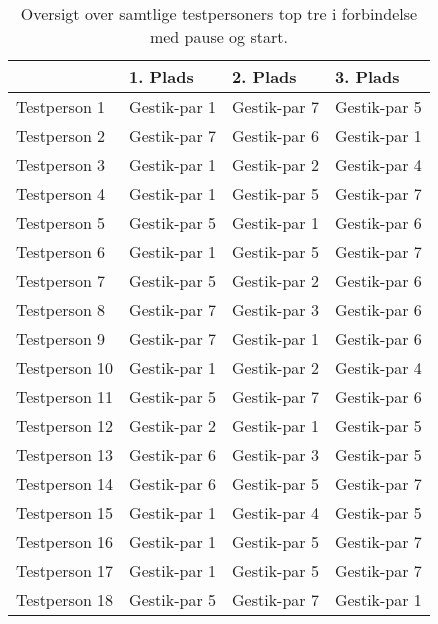 %
\begin{table}[H]
	\centering
	\begin{tabular}{ | p{3cm} | p{3cm} | p{3cm} | p{3cm} |}
	\hline
		 & 1. Plads & 2. Plads & 3. Plads \\ \hline
		Testperson 1 & Gestik-par 1 & Gestik-par 7 & Gestik-par 5 \\ \hline
		Testperson 2 & Gestik-par 7 & Gestik-par 6 & Gestik-par 1 \\ \hline
		Testperson 3 & Gestik-par 1 & Gestik-par 2 & Gestik-par 4 \\ \hline
		Testperson 4 & Gestik-par 1 & Gestik-par 5 & Gestik-par 7 \\ \hline
		Testperson 5 & Gestik-par 5 & Gestik-par 1 & Gestik-par 6 \\ \hline
		Testperson 6 & Gestik-par 1 & Gestik-par 5 & Gestik-par 7 \\ \hline 
		Testperson 7 & Gestik-par 5 & Gestik-par 2 & Gestik-par 6 \\ \hline
		Testperson 8 & Gestik-par 7 & Gestik-par 3 & Gestik-par 6 \\ \hline
		Testperson 9 & Gestik-par 7 & Gestik-par 1 & Gestik-par 6 \\ \hline
		Testperson 10 & Gestik-par 1 & Gestik-par 2 & Gestik-par 4 \\ \hline
		Testperson 11 & Gestik-par 5 & Gestik-par 7 & Gestik-par 6 \\ \hline
		Testperson 12 & Gestik-par 2 & Gestik-par 1 & Gestik-par 5 \\ \hline
		Testperson 13 & Gestik-par 6 & Gestik-par 3 & Gestik-par 5 \\ \hline
		Testperson 14 & Gestik-par 6 & Gestik-par 5 & Gestik-par 7 \\ \hline
		Testperson 15 & Gestik-par 1 & Gestik-par 4 & Gestik-par 5 \\ \hline
		Testperson 16 & Gestik-par 1 & Gestik-par 5 & Gestik-par 7 \\ \hline
		Testperson 17 & Gestik-par 1 & Gestik-par 5 & Gestik-par 7 \\ \hline
		Testperson 18 & Gestik-par 5 & Gestik-par 7 & Gestik-par 1 \\ \hline
	\end{tabular}
	\caption{Oversigt over samtlige testpersoners top tre i forbindelse med pause og start.}
	\label{tab:GestikParITopTrePause}
\end{table}
\noindent
%



